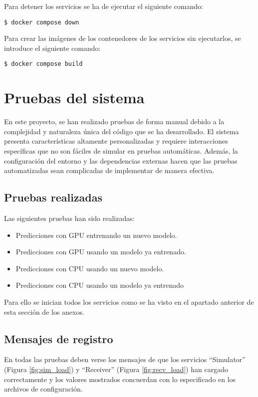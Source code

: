 Para detener los servicios se ha de ejecutar el siguiente comando:
\begin{lstlisting}
$ docker compose down
\end{lstlisting}

Para crear las imágenes de los contenedores de los servicios sin ejecutarlos, se introduce el siguiente comando:
\begin{lstlisting}
$ docker compose build
\end{lstlisting}

\section{Pruebas del sistema}

En este proyecto, se han realizado pruebas de forma manual debido a la complejidad y naturaleza única 
del código que se ha desarrollado. El sistema presenta características altamente personalizadas y requiere 
interacciones específicas que no son fáciles de simular en pruebas automáticas. Además, la configuración 
del entorno y las dependencias externas hacen que las pruebas automatizadas sean complicadas de implementar 
de manera efectiva.

\subsection{Pruebas realizadas}

Las siguientes pruebas han sido realizadas:
\begin{itemize}
    \item Predicciones con GPU entrenando un nuevo modelo.
    \item Predicciones con GPU usando un modelo ya entrenado.
    \item Predicciones con CPU usando un nuevo modelo.
    \item Predicciones con CPU usando un modelo ya entrenado
\end{itemize}

Para ello se inician todos los servicios como se ha visto en el apartado anterior de esta sección de los anexos.

\subsection{Mensajes de registro}

En todas las pruebas deben verse los mensajes de que los servicios ``Simulator'' (Figura \ref{fig:sim_load}) y ``Receiver'' (Figura \ref{fig:recv_load}) han cargado correctamente
y los valores mostrados concuerdan con lo especificado en los archivos de configuración.

